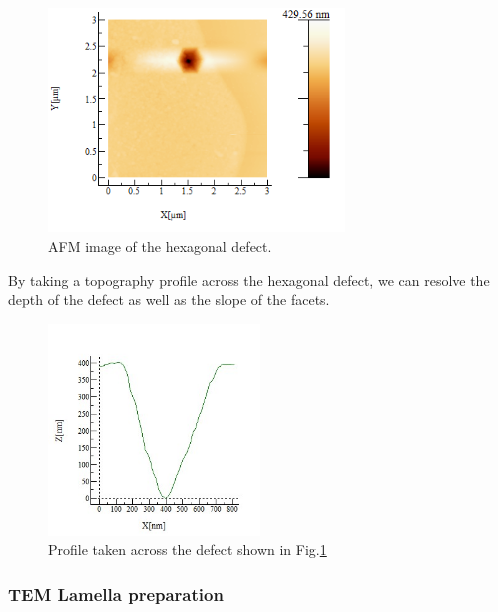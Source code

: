 \begin{figure}[!ht]
	\centering
	\includegraphics[width=0.7\textwidth]{Figs/Ch3/AFM.png}
	\caption[h] {AFM image of the hexagonal defect.}
	\label{afm-pit}
\end{figure}
\FloatBarrier 

By taking a topography profile across the hexagonal defect, we can resolve the depth of the defect as well as the slope of the facets.

\begin{figure}[!ht]
	\centering
	\includegraphics[width=0.5\textwidth]{Figs/Ch3/profile}
	\caption[h] {Profile taken across the defect shown in Fig.\ref{afm-pit}}
	\label{profile}
\end{figure}
\FloatBarrier 

\subsubsection{TEM Lamella preparation}

